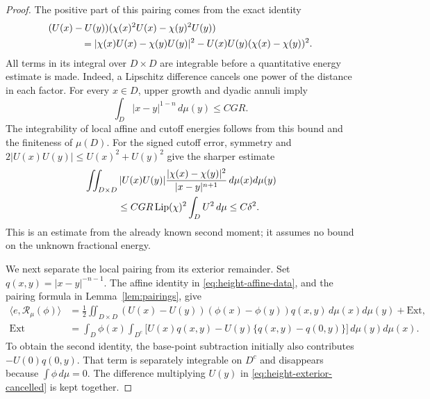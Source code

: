 \begin{proof}
The positive part of this pairing comes from the exact identity
\begin{align}
 &(U(x)-U(y))(\chi(x)^2U(x)-\chi(y)^2U(y))\notag\\
 &\hspace{12mm}=
     |\chi(x)U(x)-\chi(y)U(y)|^2
       -U(x)U(y)(\chi(x)-\chi(y))^2.
 \label{eq:height-cutoff-identity}
\end{align}
All terms in its integral over $D\times D$ are integrable before a
quantitative energy estimate is made.  Indeed, a Lipschitz difference
cancels one power of the distance in each factor.  For every $x\in D$,
upper growth and dyadic annuli imply
\begin{equation}
 \int_D |x-y|^{1-n}\,d\mu(y)\le C G R.
 \label{eq:height-near-row}
\end{equation}
The integrability of local affine and cutoff energies follows from this
bound and the finiteness of $\mu(D)$.  For the signed cutoff error, symmetry
and $2|U(x)U(y)|\le U(x)^2+U(y)^2$ give the sharper estimate
\begin{align}
 &\iint_{D\times D}
   |U(x)U(y)|\frac{|\chi(x)-\chi(y)|^2}{|x-y|^{n+1}}
                      \,d\mu(x)d\mu(y)\notag\\
 &\hspace{12mm}\le C G R\Lip(\chi)^2\int_D U^2\,d\mu
       \le C\delta^2.
 \label{eq:height-cutoff-error}
\end{align}
This is an estimate from the already known second moment; it assumes no
bound on the unknown fractional energy.

We next separate the local pairing from its exterior remainder.  Set
$q(x,y)=|x-y|^{-n-1}$.  The affine identity in
\eqref{eq:height-affine-data}, and the pairing formula in
Lemma~\ref{lem:pairings}, give
\begin{align}
 \langle e,\mathcal R_\mu(\phi)\rangle
   &=\frac12\iint_{D\times D}
        (U(x)-U(y))(\phi(x)-\phi(y))q(x,y)
                         \,d\mu(x)d\mu(y)+\mathrm{Ext},
 \label{eq:height-pairing-split}\\
 \mathrm{Ext}
   &=\int_D\phi(x)\int_{D^c}
       \bigl[U(x)q(x,y)
           -U(y)\{q(x,y)-q(0,y)\}\bigr]\,d\mu(y)d\mu(x).
 \label{eq:height-exterior-cancelled}
\end{align}
To obtain the second identity, the base-point subtraction initially also
contributes $-U(0)q(0,y)$.  That term is separately integrable on $D^c$
and disappears because $\int\phi\,d\mu=0$.  The difference multiplying
$U(y)$ in \eqref{eq:height-exterior-cancelled} is kept together.


\end{proof}

